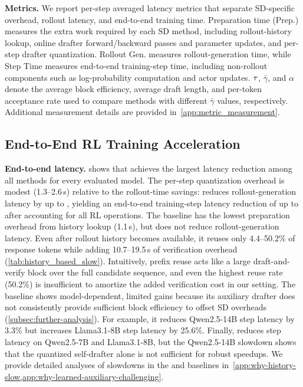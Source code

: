 \textbf{Metrics.}
We report per-step averaged latency metrics that separate SD-specific overhead, rollout latency, and end-to-end training time.
Preparation time (Prep.) measures the extra work required by each SD method, including rollout-history lookup, online drafter forward/backward passes and parameter updates, and per-step drafter quantization.
Rollout Gen. measures rollout-generation time, while Step Time measures end-to-end training-step time, including non-rollout components such as log-probability computation and actor updates.
$\tau$, $\bar{\gamma}$, and $\alpha$ denote the average block efficiency, average draft length, and per-token acceptance rate used to compare methods with different $\bar{\gamma}$ values, respectively.
Additional measurement details are provided in~\cref{app:metric_measurement}.




\subsection{End-to-End RL Training Acceleration}
\label{subsec:eval-e2e-acceleration}

\textbf{End-to-end latency.}
 shows that \methodtitle{} achieves the largest latency reduction among all methods for every evaluated model.
The per-step quantization overhead is modest (1.3--2.6\,s) relative to the rollout-time savings: \methodtitle{} reduces rollout-generation latency by up to \speeduprollout{}, yielding an end-to-end training-step latency reduction of up to \speedupete{} after accounting for all RL operations.
The \history{} baseline has the lowest preparation overhead from history lookup (1.1\,s), but does not reduce rollout-generation latency.
Even after rollout history becomes available, it reuses only 4.4--50.2\% of response tokens while adding 10.7--19.5\,s of verification overhead (\cref{tab:history_based_slow}).
Intuitively, prefix reuse acts like a large draft-and-verify block over the full candidate sequence, and even the highest reuse rate (50.2\%) is insufficient to amortize the added verification cost in our setting.
The \learned{} baseline shows model-dependent, limited gains because its auxiliary drafter does not consistently provide sufficient block efficiency to offset SD overheads (\cref{subsec:further-analysis}).
For example, it reduces Qwen2.5-14B step latency by 3.3\% but increases Llama3.1-8B step latency by 25.6\%.
Finally, \alwayssd{} reduces step latency on Qwen2.5-7B and Llama3.1-8B, but the Qwen2.5-14B slowdown shows that the quantized self-drafter alone is not sufficient for robust speedups.
We provide detailed analyses of slowdowns in the \history{} and \learned{} baselines in~\cref{app:why-history-slow,app:why-learned-auxiliary-challenging}.

